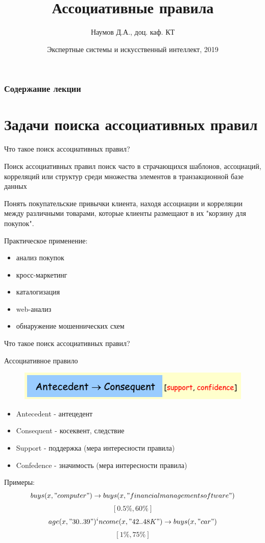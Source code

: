 \documentclass{beamer}
\title[Artifical Intelligence]{Ассоциативные правила}
\author{Наумов Д.А., доц. каф. КТ}
\date[12.02.2020] {Экспертные системы и искусственный интеллект, 2019}
\begin{document}
\begin{frame}
  \titlepage
\end{frame}
  
\begin{frame}
  \frametitle{Содержание лекции}
  \tableofcontents  
\end{frame}

\section{Задачи поиска ассоциативных правил}

\begin{frame}{Что такое поиск ассоциативных правил?}
\begin{block}{Поиск ассоциативных правил}
поиск часто в страчающихся шаблонов, ассоциаций, корреляций или структур
среди множества элементов в транзакционной базе данных
\end{block}
Понять покупательские привычки клиента, находя ассоциации и корреляции между различными товарами, которые клиенты размещают в их "корзину для покупок". 

Практическое применение:
\begin{itemize}
\item анализ покупок
\item кросс-маркетинг
\item каталогизация
\item web-анализ
\item обнаружение мошеннических схем
\end{itemize} 
\end{frame}

\begin{frame}{Что такое поиск ассоциативных правил?}
\begin{block}{Ассоциативное правило}
\begin{figure}[h]
\centering
\includegraphics[scale=0.75]{images/lec08-pic01.png}
\end{figure}
\end{block}
\begin{itemize}
\item Antecedent - антецедент
\item Consequent - косеквент, следствие
\item Support - поддержка (мера интересности правила)
\item Confedence - значимость (мера интересности правила)
\end{itemize} 
Примеры:
\[buys(x, "computer") \rightarrow buys(x, "financial management software")\]
\[[0.5\%, 60\%]\]
\[age(x, "30..39") ^ income(x, "42..48K") \rightarrow buys(x, "car")\]
\[[1\%,75\%]\]
\end{frame}
\end{document}
